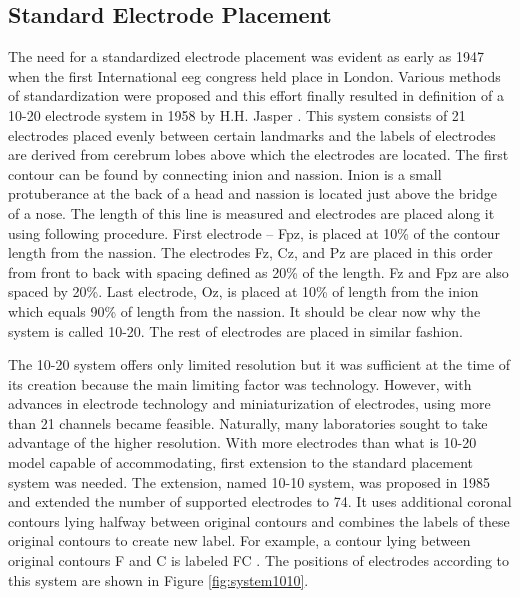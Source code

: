 \subsection{Standard Electrode Placement}
\label{ssec:elPlacement}
The need for a standardized electrode placement was evident as early as 1947 when
the first International \gls{eeg} congress held place in London. Various methods of
standardization were proposed and this effort finally resulted in definition
of a 10-20 electrode system in 1958 by H.H. Jasper \cite{placeSys}. 
This system consists of 21 electrodes placed evenly between certain landmarks
and the labels of electrodes are derived from cerebrum lobes above which the electrodes
are located. The first contour can be found by connecting inion and nassion.
Inion is a small protuberance at the back of a head and nassion is located just
above the bridge of a nose. The length of this line is measured and electrodes are
placed along it using following procedure. First electrode -- Fpz, is placed at
10\% of the contour length from the nassion. The electrodes Fz, Cz, and Pz are placed in this
order from front to back with spacing defined as 20\% of the length. Fz and Fpz are also
spaced by 20\%. Last electrode, Oz, is placed at 10\% of length from the inion
which equals 90\% of length from the nassion. It should be clear now why the system
is called 10-20. The rest of electrodes are placed in similar fashion.

The 10-20 system offers only limited resolution but it was sufficient at the
time of its creation because the main limiting factor was technology. However,
with advances in electrode technology and miniaturization of electrodes, using more than
21 channels became feasible. Naturally, many laboratories sought to take advantage of the
higher resolution. With more electrodes than what is 10-20 model capable of
accommodating, first extension to the standard placement system was needed. The
extension, named 10-10 system, was proposed in 1985 and extended the number of supported
electrodes to 74. It uses additional coronal contours lying halfway between
original contours and combines the labels of these original contours to create
new label. For example, a contour lying between original contours F and C is labeled FC \cite{placeSys}. The positions of electrodes according to this
system are shown in Figure \ref{fig:system1010}. 


